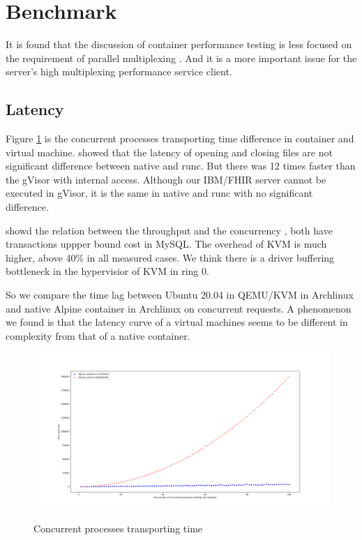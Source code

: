\section{Benchmark}
It is found that the discussion of container performance testing is less
focused on the requirement of parallel multiplexing
\cite{7371699,KOZHIRBAYEV2017175,7095802,234857}. And it is a more
important issue for the server's high multiplexing performance service client.

\subsection{Latency}
Figure \ref{conc} is the concurrent processes transporting time
difference in container and virtual machine.
\textcite{234857} showed that the latency of opening and closing files
are not significant difference between native and runc. But there was 12 times
faster than the gVisor with internal access. Although our IBM/FHIR server
cannot be executed in gVisor, it is the same in native and runc with no
significant difference.

\textcite{7095802} showd the relation between the throughput and the concurrency 
, both have transactions uppper bound cost in MySQL. The overhead of KVM is
much higher, above 40\% in all measured cases. We think there is a driver
buffering bottleneck in the hypervisior of KVM in ring 0.

So we compare the time lag between Ubuntu 20.04 in QEMU/KVM in Archlinux
and native Alpine container in Archlinux on concurrent requests. 
A phenomenon we found is that the latency curve of a virtual
machines seems to be different in complexity from that of a native container.

\begin{figure}
    \centering
    \includegraphics[width=\textwidth]{src/concurrent.png}
    \label{conc}
    \caption{Concurrent processes transporting time}
\end{figure}
